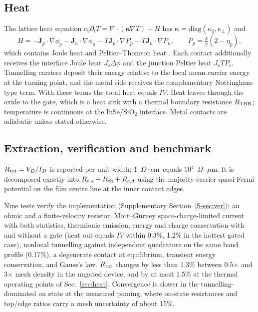 \documentclass[11pt]{article}
\providecommand{\ohmcm}{\ensuremath{\Omega\cdot\mathrm{cm}}}
\providecommand{\ohmum}{\ensuremath{\Omega\cdot\mu\mathrm{m}}}
\providecommand{\ohmcm}{\ensuremath{\Omega\cdot\mathrm{cm}}}
\providecommand{\ohmum}{\ensuremath{\Omega\cdot\mu\mathrm{m}}}
\begin{document}
\subsection{Heat}
The lattice heat equation $c_V\partial_tT=\nabla\cdot(\boldsymbol\kappa\nabla T)+H$ has $\boldsymbol\kappa=\mathrm{diag}(\kappa_\parallel,\kappa_\perp)$ and
\begin{equation}
H=-\mathbf J_p\cdot\nabla\phi_p-\mathbf J_n\cdot\nabla\phi_n-T\mathbf J_p\cdot\nabla P_p-T\mathbf J_n\cdot\nabla P_n,\qquad P_p=\tfrac{k}{q}(2-\eta_p),
\end{equation}
which contains Joule heat and Peltier--Thomson heat \cite{refwachutka}. Each contact additionally receives the interface Joule heat $J_s\Delta\phi$ and the junction Peltier heat $J_sTP_s$. Tunnelling carriers deposit their energy relative to the local mean carrier energy at the turning point, and the metal side receives the complementary Nottingham-type term. With these terms the total heat equals $IV$. Heat leaves through the oxide to the gate, which is a heat sink with a thermal boundary resistance $R_{\rm TBR}$; temperature is continuous at the InSe/SiO$_2$ interface. Metal contacts are adiabatic unless stated otherwise.

\subsection{Extraction, verification and benchmark}
\label{sec:ver}
$R_{\rm tot}=V_D/I_D$ is reported per unit width; 1~\ohmcm\ equals $10^4$~\ohmum. It is decomposed exactly into $R_{c,s}+R_{\rm ch}+R_{c,d}$ using the majority-carrier quasi-Fermi potential on the film centre line at the inner contact edges.

Nine tests verify the implementation (Supplementary Section~\ref{S-sec:ver}): an ohmic and a finite-velocity resistor, Mott--Gurney space-charge-limited current with both statistics, thermionic emission, energy and charge conservation with and without a gate (heat out equals $IV$ within 0.3\%, 1.2\% in the hottest gated case), nonlocal tunnelling against independent quadrature on the same band profile (0.17\%), a degenerate contact at equilibrium, transient energy conservation, and Gauss's law. $R_{\rm tot}$ changes by less than 1.3\% between 0.5$\times$ and 3$\times$ mesh density in the ungated device, and by at most 1.5\% at the thermal operating points of Sec.~\ref{sec:heat}. Convergence is slower in the tunnelling-dominated on state at the measured pinning, where on-state resistances and top/edge ratios carry a mesh uncertainty of about 15\%.
\end{document}
